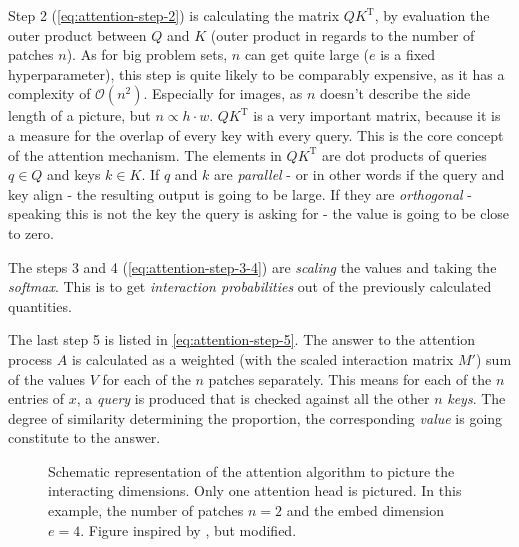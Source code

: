 Step 2 (\autoref{eq:attention-step-2}) is calculating the matrix $QK^\mathrm{T}$, by evaluation the \glqq outer product\grqq{} between $Q$ and $K$ (outer product in regards to the number of patches $n$).
As for big problem sets, $n$ can get quite large ($e$ is a fixed hyperparameter), this step is quite likely to be comparably expensive, as it has a complexity of $\mathcal{O}(n^2)$.
Especially for images, as $n$ doesn't describe the side length of a picture, but $n \propto h \cdot w$.
$QK^\mathrm{T}$ is a very important matrix, because it is a measure for the \glqq overlap\grqq{} of every key with every query. 
This is the core concept of the attention mechanism. 
The elements in $QK^\mathrm{T}$ are dot products of queries $q \in Q$ and keys $k \in K$. If $q$ and $k$ are \emph{parallel} - or in other words if the query and key align - the resulting output is going to be large.
If they are \emph{orthogonal} - speaking this is not the key the query is asking for - the value is going to be close to zero.

The steps 3 and 4 (\autoref{eq:attention-step-3-4}) are \emph{scaling} the values and taking the \emph{softmax}. 
This is to get \emph{interaction probabilities} out of the previously calculated quantities.

The last step 5 is listed in \autoref{eq:attention-step-5}.
The answer to the attention process $A$ is calculated as a weighted (with the scaled interaction matrix $M'$) sum of the values $V$ for each of the $n$ patches separately. 
This means for each of the $n$ entries of $x$, a \emph{query} is produced that is checked against all the other $n$ \emph{keys}. 
The degree of similarity determining the proportion, the corresponding \emph{value} is going constitute to the answer.

\begin{figure}[htbp]
    \centering
    \caption{Schematic representation of the attention algorithm to picture the interacting dimensions.
            Only one attention head is pictured.
            In this example, the number of patches $n=2$ and the embed dimension $e=4$.
            Figure inspired by \cite{attentionVisualizationDimensionality}, but modified.
            }
    \label{fig:attention-visualization}
\end{figure}

